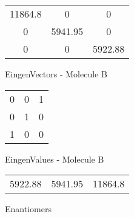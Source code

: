 \begin{multicols}{2}
\begin{center}
\begin{tabular}{|c c c|}
11864.8	 & 	0	 & 	0	 \\
0	 & 	5941.95	 & 	0	 \\
0	 & 	0	 & 	5922.88
\end{tabular}

\vtab
 EingenVectors - Molecule B     \\
\vtab
\begin{tabular}{|c c c|}
0	 & 	0	 & 	1	 \\
0	 & 	1	 & 	0	 \\
1	 & 	0	 & 	0
\end{tabular}

\vtab
 EingenValues - Molecule B     \\
\vtab
\begin{tabular}{|c c c|}
5922.88	 & 	5941.95	 & 	11864.8	 \\
\end{tabular}

\end{center}
\end{multicols}
\begin{center}
\vtab
\vtab
\textcolor{NavyBlue}{\Large Enantiomers}
\end{center}

 \newpage

